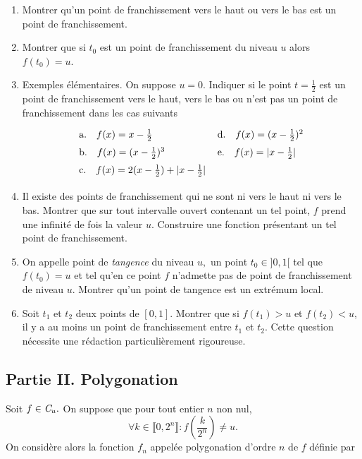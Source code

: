 \begin{enumerate}
\item  Montrer qu'un point de franchissement vers le haut ou vers le bas est un point de franchissement.

\item  Montrer que si $t_{0}$ est un point de franchissement du niveau $u$ alors $f(t_{0})=u$.

\item  Exemples {\'e}l{\'e}mentaires.\newline
On suppose $u=0$. Indiquer si le point $t=\frac{1}{2}$ est un point de franchissement vers le haut, vers le bas ou
n'est pas un point de franchissement dans les cas suivants
\[
\renewcommand{\arraystretch}{1.5}
\begin{tabular}{ll}
a.\quad $f(x)=x-\frac{1}{2}$ & d.\quad $f(x)=(x-\frac{1}{2})^{2}$ \\
b.\quad $f(x)=(x-\frac{1}{2})^{3}$ & e.\quad $f(x)=| x-\frac{1}{2}| $ \\
c.\quad $f(x)=2(x-\frac{1}{2})+| x-\frac{1}{2}| $ &
\end{tabular}
\]

\item  Il existe des points de franchissement qui ne sont ni vers le haut ni vers le bas. Montrer que sur tout intervalle ouvert contenant un tel point, $f$ prend une infinit{\'e} de fois la valeur $u$. Construire une fonction pr{\'e}sentant un tel point de franchissement.

\item  On appelle point de \emph{tangence} du niveau $u,$ un point $t_{0}\in ] 0,1[ $ tel que $f(t_{0})=u$ et tel qu'en ce point $f$ n'admette
pas de point de franchissement de niveau $u$. Montrer qu'un point de tangence est un extr{\'e}mum local.

\item  Soit $t_{1}$ et $t_{2}$ deux points de $[ 0,1] $. Montrer que si $f(t_{1})>u$ et $f(t_{2})<u$, il y a au moins un point de
franchissement entre $t_{1}$ et $t_{2}$. Cette question n{\'e}cessite une r{\'e}daction particuli{\`e}rement rigoureuse.
\end{enumerate}

\subsection*{Partie II. Polygonation}

Soit $f\in \emph{C}_{u}.$ On suppose que pour tout entier $n$ non nul,
\[
\forall k\in  \llbracket 0, 2^{n}\rrbracket : f(\frac{k}{2^{n}})\neq u.
\]
On consid{\`e}re alors la fonction $f_{n}$ appel{\'e}e polygonation d'ordre $n$ de $f$ d{\'e}finie par


